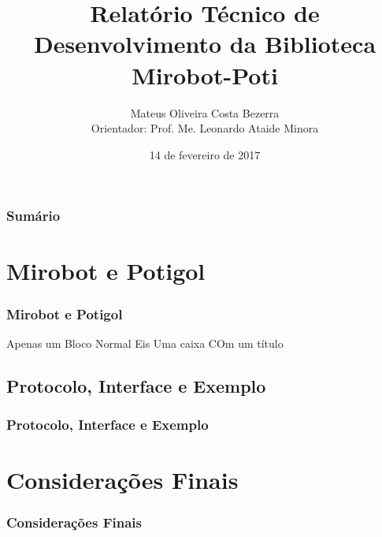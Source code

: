 \documentclass{beamer}
\begin{document}
\title[IFRN - CNAT]
      {Relatório Técnico de Desenvolvimento da Biblioteca Mirobot-Poti}
      \author[Mateus Oliveira Costa Bezerra]
             {Mateus Oliveira Costa Bezerra \\ Orientador: Prof. Me. Leonardo Ataide Minora}
  \date{14 de fevereiro de 2017}
\begin{frame}
  \label{capa}
  \maketitle
\end{frame}

\begin{frame}
  \label{sumario}
  \frametitle{Sumário}
  \tableofcontents
\end{frame}

\begin{frame}
  \label{mirobot:potigol}
  \section{Mirobot e Potigol}
  \frametitle{Mirobot e Potigol}
  \begin{block}{Apenas um Bloco Normal}
    Eis Uma caixa COm um título
  \end{block}
\end{frame}

\begin{frame}
  \section{Protocolo, Interface e Exemplo}
  \label{protocolo}
  \frametitle{Protocolo, Interface e Exemplo}
\end{frame}

\begin{frame}
  \label{consideracoes}
  \section{Considerações Finais}
  \frametitle{Considerações Finais}
\end{frame}
\end{document}
